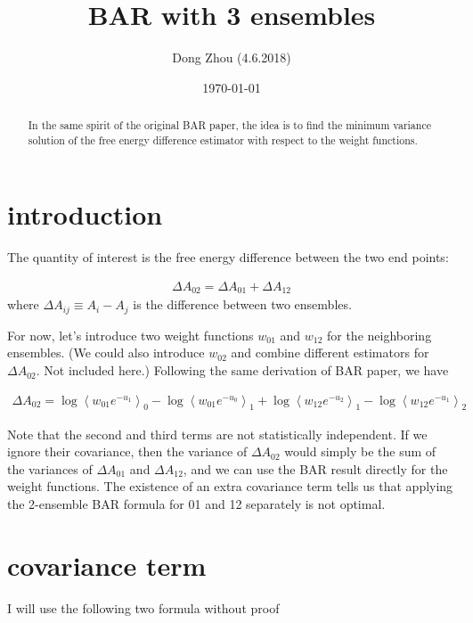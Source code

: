 \documentclass[notitlepage, amsmath, amssymb, aps]{revtex4-1}  %
\begin{document}
\title{BAR with 3 ensembles}

\author{Dong Zhou (4.6.2018)}
\date{\today}


\begin{abstract}
In the same spirit of the original BAR paper, the idea is to find the minimum variance solution
of the free energy difference estimator with respect to the weight functions.
\end{abstract}

\maketitle

\section{introduction}

The quantity of interest is the free energy difference between the two end points:

\begin{align}
\Delta A_{02} = \Delta A_{01} + \Delta A_{12}
\end{align}
where $\Delta A_{ij} \equiv A_i - A_j$ is the difference between two ensembles.

For now, let's introduce two weight functions $w_{01}$ and $w_{12}$ for the neighboring ensembles.
(We could also introduce $w_{02}$ and combine different estimators for $\Delta A_{02}$. Not included here.)
Following the same derivation of BAR paper, we have

\begin{align}
\Delta A_{02} = \log\left<w_{01} e^{-u_1}\right>_0 - \log\left<w_{01}e^{-u_0}\right>_1
              + \log\left<w_{12} e^{-u_2}\right>_1 - \log\left<w_{12}e^{-u_1}\right>_2
\end{align}

Note that the second and third terms are not statistically independent.
If we ignore their covariance, then the variance of $\Delta A_{02}$ would simply be the sum of
the variances of $\Delta A_{01}$ and $\Delta A_{12}$, and we can use the BAR result directly for the weight functions.
The existence of an extra covariance term tells us that applying the 2-ensemble BAR formula for 01 and 12 separately is not optimal.

\section{covariance term}
I will use the following two formula without proof
\end{document}
